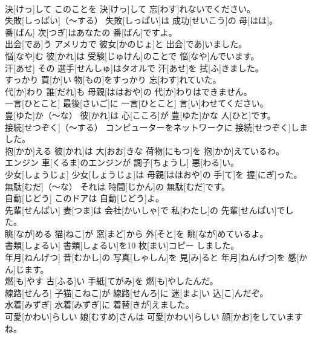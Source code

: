 \documentclass[8pt]{extreport}
\begin{document}
\begin{CJK}{UTF8}{min}
\\	決[けっ]して	このことを 決[けっ]して 忘[わす]れないでください。		
\\	失敗[しっぱい]（～する）	失敗[しっぱい]は 成功[せいこう]の 母[はは]。		
\\	番[ばん]	次[つぎ]はあなたの 番[ばん]ですよ。		
\\	出会[であ]う	アメリカで 彼女[かのじょ]と 出会[であ]いました。		
\\	悩[なや]む	彼[かれ]は 受験[じゅけん]のことで 悩[なや]んでいます。		
\\	汗[あせ]	その 選手[せんしゅ]はタオルで 汗[あせ]を 拭[ふ]きました。		
\\	すっかり	買[か]い 物[もの]をすっかり 忘[わす]れていた。		
\\	代[か]わり	誰[だれ]も 母親[ははおや]の 代[か]わりはできません。		
\\	一言[ひとこと]	最後[さいご]に 一言[ひとこと] 言[い]わせてください。		
\\	豊[ゆた]か（～な）	彼[かれ]は 心[こころ]が 豊[ゆた]かな 人[ひと]です。		
\\	接続[せつぞく]（～する）	コンピューターをネットワークに 接続[せつぞく]しました。		
\\	抱[かか]える	彼[かれ]は 大[おお]きな 荷物[にもつ]を 抱[かか]えているわ。		
\\	エンジン	車[くるま]のエンジンが 調子[ちょうし] 悪[わる]い。		
\\	少女[しょうじょ]	少女[しょうじょ]は 母親[ははおや]の 手[て]を 握[にぎ]った。		
\\	無駄[むだ]（～な）	それは 時間[じかん]の 無駄[むだ]です。		
\\	自動[じどう]	このドアは 自動[じどう]よ。		
\\	先輩[せんぱい]	妻[つま]は 会社[かいしゃ]で 私[わたし]の 先輩[せんぱい]でした。		
\\	眺[なが]める	猫[ねこ]が 窓[まど]から 外[そと]を 眺[なが]めているよ。		
\\	書類[しょるい]	書類[しょるい]を10 枚[まい]コピー しました。		
\\	年月[ねんげつ]	昔[むかし]の 写真[しゃしん]を 見[み]ると 年月[ねんげつ]を 感[かん]じます。		
\\	燃[も]やす	古[ふる]い 手紙[てがみ]を 燃[も]やしたんだ。		
\\	線路[せんろ]	子猫[こねこ]が 線路[せんろ]に 迷[まよ]い 込[こ]んだぞ。		
\\	水着[みずぎ]	水着[みずぎ]に 着替[きが]えました。		
\\	可愛[かわい]らしい	娘[むすめ]さんは 可愛[かわい]らしい 顔[かお]をしていますね。		

\end{CJK}
\end{document}
